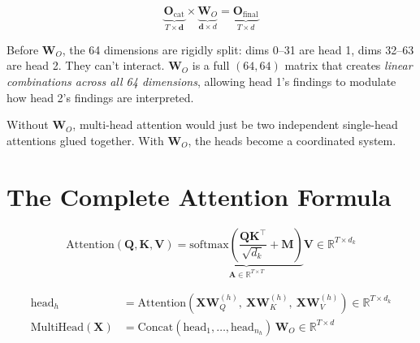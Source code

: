 \documentclass[11pt, a4paper]{article}
\newcommand{\R}{\mathbb{R}}
\newcommand{\mW}{\bm{W}}
\newcommand{\mQ}{\bm{Q}}
\newcommand{\mK}{\bm{K}}
\newcommand{\mV}{\bm{V}}
\newcommand{\mX}{\bm{X}}
\newcommand{\mA}{\bm{A}}
\newcommand{\mO}{\bm{O}}
\begin{document}
\begin{dimcheck}
\[
\underbrace{\mO_{\text{cat}}}_{T \times \mathbf{d}} \times \underbrace{\mW_O}_{\mathbf{d} \times d} = \underbrace{\mO_{\text{final}}}_{T \times d}
\]
\end{dimcheck}

\begin{intuition}
Before $\mW_O$, the 64 dimensions are rigidly split: dims 0--31 are head 1,
dims 32--63 are head 2. They can't interact. $\mW_O$ is a full $(64, 64)$ matrix
that creates \textit{linear combinations across all 64 dimensions}, allowing
head 1's findings to modulate how head 2's findings are interpreted.

Without $\mW_O$, multi-head attention would just be two independent single-head
attentions glued together. With $\mW_O$, the heads become a coordinated system.
\end{intuition}

\section{The Complete Attention Formula}

\begin{formaldef}
\[
\text{Attention}(\mQ, \mK, \mV) = \underbrace{\text{softmax}\!\left(\frac{\mQ\mK^\top}{\sqrt{d_k}} + \bm{M}\right)}_{\mA \in \R^{T \times T}} \mV \in \R^{T \times d_k}
\]
\end{formaldef}

\begin{formaldef}
\begin{align}
\text{head}_h &= \text{Attention}(\mX\mW_Q^{(h)},\ \mX\mW_K^{(h)},\ \mX\mW_V^{(h)}) \in \R^{T \times d_k} \\[6pt]
\text{MultiHead}(\mX) &= \text{Concat}(\text{head}_1, \ldots, \text{head}_{n_h}) \, \mW_O \in \R^{T \times d}
\end{align}
\end{formaldef}
\end{document}
